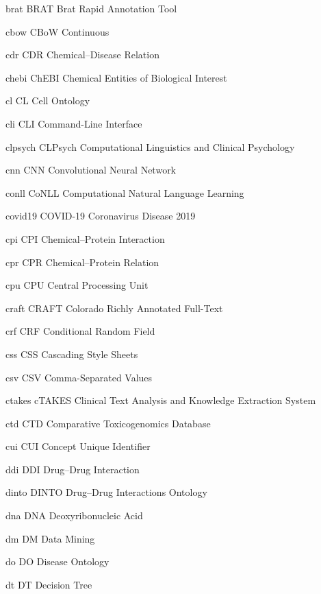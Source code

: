 \newabbreviation
{brat}
{BRAT}
{Brat Rapid Annotation Tool}

\newabbreviation
{cbow}
{CBoW}
{Continuous }

\newabbreviation
{cdr}
{CDR}
{Chemical--Disease Relation}

\newabbreviation
{chebi}
{ChEBI}
{Chemical Entities of Biological Interest}

\newabbreviation
{cl}
{CL}
{Cell Ontology}

\newabbreviation
{cli}
{CLI}
{Command-Line Interface}

\newabbreviation
{clpsych}
{CLPsych}
{Computational Linguistics and Clinical Psychology}

\newabbreviation
{cnn}
{CNN}
{Convolutional Neural Network}

\newabbreviation
{conll}
{CoNLL}
{Computational Natural Language Learning}

\newabbreviation
{covid19}
{COVID-19}
{Coronavirus Disease 2019}

\newabbreviation
{cpi}
{CPI}
{Chemical--Protein Interaction}

\newabbreviation
{cpr}
{CPR}
{Chemical--Protein Relation}

\newabbreviation
{cpu}
{CPU}
{Central Processing Unit}

\newabbreviation
{craft}
{CRAFT}
{Colorado Richly Annotated Full-Text}

\newabbreviation
{crf}
{CRF}
{Conditional Random Field}

\newabbreviation
{css}
{CSS}
{Cascading Style Sheets}

\newabbreviation
{csv}
{CSV}
{Comma-Separated Values}

\newabbreviation
{ctakes}
{cTAKES}
{Clinical Text Analysis and Knowledge Extraction System}

\newabbreviation
{ctd}
{CTD}
{Comparative Toxicogenomics Database}

\newabbreviation
{cui}
{CUI}
{Concept Unique Identifier}

\newabbreviation
{ddi}
{DDI}
{Drug--Drug Interaction}

\newabbreviation
{dinto}
{DINTO}
{Drug--Drug Interactions Ontology}

\newabbreviation
{dna}
{DNA}
{Deoxyribonucleic Acid}

\newabbreviation
{dm}
{DM}
{Data Mining}

\newabbreviation
{do}
{DO}
{Disease Ontology}

\newabbreviation
{dt}
{DT}
{Decision Tree}

